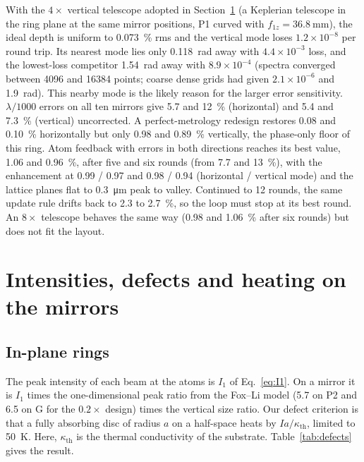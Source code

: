 \documentclass[11pt]{article}
\begin{document}
With the $4\times$ vertical telescope adopted in Section~\ref{sec:defects} (a Keplerian telescope in the
ring plane at the same mirror positions, P1 curved with $f_{1z} = \SI{36.8}{\milli\metre}$), the ideal depth
is uniform to \SI{0.073}{\percent} rms and the vertical mode loses $1.2\times10^{-8}$ per round trip. Its
nearest mode lies only \SI{0.118}{\radian} away with $4.4\times10^{-3}$ loss, and the lowest-loss competitor
\SI{1.54}{\radian} away with $8.9\times10^{-4}$ (spectra converged between 4096 and 16384 points; coarse
dense grids had given $2.1\times10^{-6}$ and \SI{1.9}{\radian}). This nearby mode is the likely reason for the
larger error sensitivity. $\lambda/1000$ errors on all ten mirrors give 5.7 and
\SI{12}{\percent} (horizontal) and 5.4 and \SI{7.3}{\percent} (vertical) uncorrected. A perfect-metrology
redesign restores 0.08 and \SI{0.10}{\percent} horizontally but only 0.98 and \SI{0.89}{\percent} vertically,
the phase-only floor of this ring. Atom feedback with errors in both directions reaches its best value,
1.06 and \SI{0.96}{\percent}, after five and six rounds (from 7.7 and \SI{13}{\percent}), with the
enhancement at 0.99 / 0.97 and 0.98 / 0.94 (horizontal / vertical mode) and the lattice planes flat to
\SI{0.3}{\micro\metre} peak to valley. Continued to 12 rounds, the same update rule drifts back to 2.3 to
\SI{2.7}{\percent}, so the loop must stop at its best round. An $8\times$ telescope behaves the same way
(0.98 and \SI{1.06}{\percent} after six rounds) but does not fit the layout.

\section{Intensities, defects and heating on the mirrors}
\label{sec:defects}

\subsection{In-plane rings}

The peak intensity of each beam at the atoms is $I_1$ of Eq.~\eqref{eq:I1}. On a mirror it is $I_1$
times the one-dimensional peak ratio from the Fox--Li model (5.7 on P2 and 6.5 on G for the
$0.2\times$ design) times the vertical size ratio. Our defect criterion is that a fully absorbing disc
of radius $a$ on a half-space heats by $I a / \kappa_\mathrm{th}$, limited to \SI{50}{\kelvin}. Here,
$\kappa_\mathrm{th}$ is the thermal conductivity of the substrate. Table~\ref{tab:defects} gives the
result.
\end{document}
